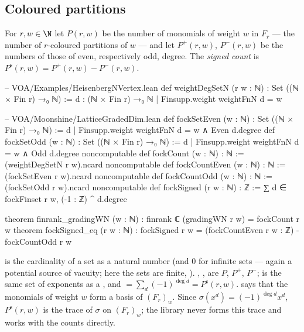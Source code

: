\subsection{Coloured partitions}

\begin{definition}\label{ch04:def:fockcount}
For $r,w\in\N$ let $P(r,w)$ be the number of monomials of weight $w$ in $F_r$ --- the number of
$r$-coloured partitions of $w$ --- and let $P^+(r,w)$, $P^-(r,w)$ be the numbers of those of even,
respectively odd, degree. The \emph{signed count} is $P^{\mathrm{s}}(r,w)=P^+(r,w)-P^-(r,w)$.
\end{definition}

\begin{leancode}
-- VOA/Examples/HeisenbergNVertex.lean
def weightDegSetN (r w : ℕ) : Set ((ℕ × Fin r) →₀ ℕ) :=
  {d : (ℕ × Fin r) →₀ ℕ | Finsupp.weight weightFnN d = w}

-- VOA/Moonshine/LatticeGradedDim.lean
def fockSetEven (w : ℕ) : Set ((ℕ × Fin r) →₀ ℕ) :=
  {d | Finsupp.weight weightFnN d = w ∧ Even d.degree}
def fockSetOdd (w : ℕ) : Set ((ℕ × Fin r) →₀ ℕ) :=
  {d | Finsupp.weight weightFnN d = w ∧ Odd d.degree}
noncomputable def fockCount (w : ℕ) : ℕ := (weightDegSetN r w).ncard
noncomputable def fockCountEven (w : ℕ) : ℕ := (fockSetEven r w).ncard
noncomputable def fockCountOdd (w : ℕ) : ℕ := (fockSetOdd r w).ncard
noncomputable def fockSigned (r w : ℕ) : ℤ := ∑ d ∈ fockFinset r w, (-1 : ℤ) ^ d.degree

theorem finrank_gradingWN (w : ℕ) : finrank ℂ (gradingWN r w) = fockCount r w
theorem fockSigned_eq (r w : ℕ) :
    fockSigned r w = (fockCountEven r w : ℤ) - fockCountOdd r w
\end{leancode}

\begin{dictionary}
 is the cardinality of a set as a natural number (and $0$ for infinite sets ---
again a potential source of vacuity; here the sets are finite, ).
, ,  are $P$, $P^+$, $P^-$;
 is the same set of exponents as a , and
 $=\sum_d(-1)^{\deg d}=P^{\mathrm s}(r,w)$.  says that
the monomials of weight $w$ form a basis of $(F_r)_w$. Since $\sigma(x^d)=(-1)^{\deg d}x^d$,
$P^{\mathrm s}(r,w)$ is the trace of $\sigma$ on $(F_r)_w$; the library never forms this trace and
works with the counts directly.
\end{dictionary}

